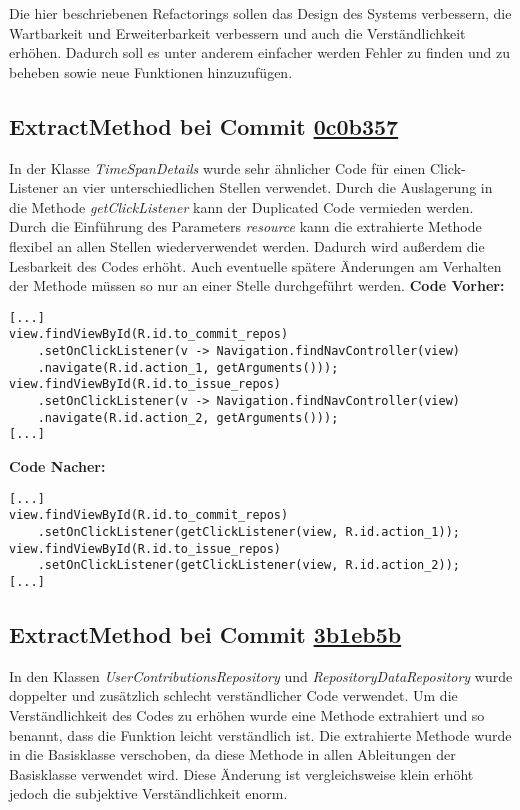 Die hier beschriebenen Refactorings sollen das Design des Systems verbessern, die Wartbarkeit und Erweiterbarkeit verbessern und auch die Verständlichkeit erhöhen.
Dadurch soll es unter anderem einfacher werden Fehler zu finden und zu beheben sowie neue Funktionen hinzuzufügen.


\subsection{ExtractMethod bei Commit \href{https://github.com/lukaspanni/OpenSourceStats/commit/0c0b357dee742575d8465ae26e64152bfecbf5ab} {0c0b357}}
\label{sec:ExtractMethod_TimeSpanDetails}

In der Klasse \textit{TimeSpanDetails} wurde sehr ähnlicher Code für einen Click-Listener an vier unterschiedlichen Stellen verwendet. Durch die Auslagerung in die Methode \textit{getClickListener}  kann der Duplicated Code vermieden werden. Durch die Einführung des Parameters \textit{resource} kann die extrahierte Methode flexibel an allen Stellen wiederverwendet werden. Dadurch wird außerdem die Lesbarkeit des Codes erhöht.
Auch eventuelle spätere Änderungen am Verhalten der Methode müssen so nur an einer Stelle durchgeführt werden.
\newline
\textbf{Code Vorher:} 
\begin{lstlisting}[breaklines=false]
[...]
view.findViewById(R.id.to_commit_repos)
    .setOnClickListener(v -> Navigation.findNavController(view)
    .navigate(R.id.action_1, getArguments()));
view.findViewById(R.id.to_issue_repos)
    .setOnClickListener(v -> Navigation.findNavController(view)
    .navigate(R.id.action_2, getArguments()));
[...]
\end{lstlisting}
\textbf{Code Nacher:} 
\begin{lstlisting}[breaklines=false]
[...]
view.findViewById(R.id.to_commit_repos)
    .setOnClickListener(getClickListener(view, R.id.action_1));
view.findViewById(R.id.to_issue_repos)
    .setOnClickListener(getClickListener(view, R.id.action_2));
[...]
\end{lstlisting}

\newpage
\subsection{ExtractMethod bei Commit \href{https://github.com/lukaspanni/OpenSourceStats/commit/3b1eb5bf6750c3ccaeb05962ec8a8ae743adbf2c} {3b1eb5b}}
\label{sec:ExtractMethod_Repository}

In den Klassen \textit{UserContributionsRepository} und \textit{RepositoryDataRepository} wurde doppelter und zusätzlich schlecht verständlicher Code verwendet. Um die Verständlichkeit des Codes zu erhöhen wurde eine Methode extrahiert und so benannt, dass die Funktion leicht verständlich ist. Die extrahierte Methode wurde in die Basisklasse verschoben, da diese Methode in allen Ableitungen der Basisklasse verwendet wird. Diese Änderung ist vergleichsweise klein erhöht jedoch die subjektive Verständlichkeit enorm.
